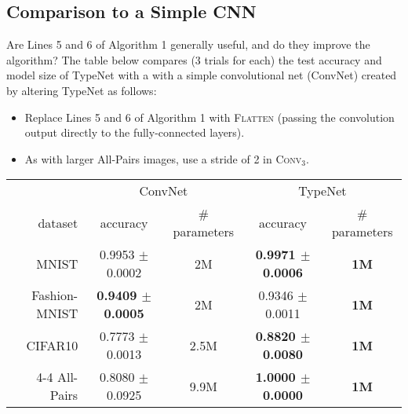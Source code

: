 \subsection{Comparison to a Simple CNN}
\label{comptocnn}
\noindent
Are Lines 5 and 6 of Algorithm 1 generally useful, and do they improve the algorithm?
The table below compares (3 trials for each) the test accuracy and model size of TypeNet with a with a simple convolutional net (ConvNet) created by altering TypeNet as follows:
\begin{itemize}
\item Replace Lines 5 and 6 of Algorithm 1 with \textsc{Flatten} (passing the convolution output directly to the fully-connected layers).
\item As with larger All-Pairs images, use a stride of 2 in \textsc{Conv}$_3$.
\end{itemize}


\begin{center}
\begin{tabular}{ r | c c | c c  }
              & \multicolumn{2}{c|}{ConvNet}                        & \multicolumn{2}{c}{TypeNet}  \\
dataset  & accuracy & \# parameters & accuracy & \# parameters \\
\hline
MNIST               & 0.9953 $\pm$ 0.0002    & 2M & \textbf{0.9971 $\pm$ 0.0006} & \textbf{1M}  \\
Fashion-MNIST & \textbf{0.9409 $\pm$ 0.0005}    & 2M & 0.9346 $\pm$ 0.0011 & \textbf{1M} \\
CIFAR10           & 0.7773 $\pm$ 0.0013     & 2.5M & \textbf{0.8820 $\pm$ 0.0080} & \textbf{1M} \\
4-4 All-Pairs      & 0.8080 $\pm$ 0.0925     & 9.9M & \textbf{1.0000 $\pm$ 0.0000} & \textbf{1M} \\
\end{tabular}
\end{center}

